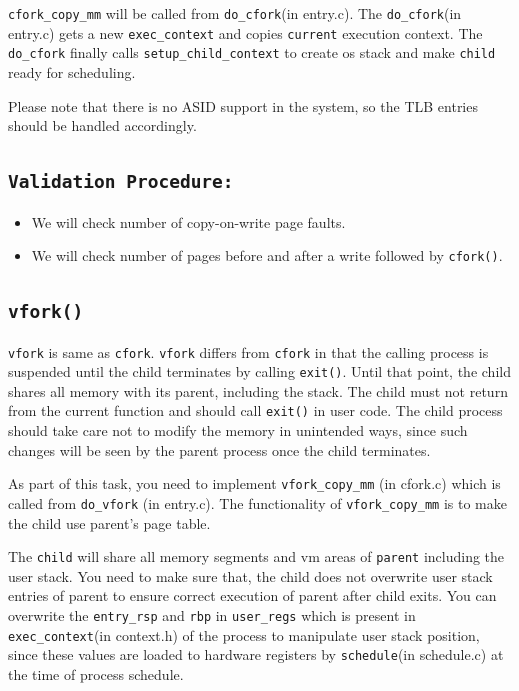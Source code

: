 \documentclass[12pt]{article}
\begin{document}
{\tt cfork\_copy\_mm} will be called from {\tt do\_cfork}(in entry.c). The {\tt do\_cfork}(in entry.c) gets a new {\tt exec\_context}
and copies {\tt current} execution context. The {\tt do\_cfork} finally calls {\tt setup\_child\_context} to create os stack and make {\tt child} ready for scheduling.

Please note that there is no ASID support in the system, so the TLB entries should be handled accordingly.

\subsection*{\tt Validation Procedure:}		
     \begin{itemize}		
        \item We will check number of copy-on-write page faults.		
        \item We will check number of pages before and after a write followed by {\tt cfork()}.		
        \end{itemize}

\subsection*{\tt vfork()}

{\tt vfork} is same as {\tt cfork}. {\tt vfork} differs from {\tt cfork} in that the calling process is suspended until the child terminates by calling {\tt exit()}. Until that point, the child shares all memory with its parent, including the stack. The child must not return from the current function and should call {\tt exit()} in user code. The child process should take care not to modify the memory in unintended ways, since such changes will be seen by the parent process once the child terminates.

			
As part of this task, you need to implement {\tt vfork\_copy\_mm} (in cfork.c) which is called from {\tt do\_vfork} (in entry.c). The functionality of {\tt vfork\_copy\_mm} is to make the child use parent's page table.

The {\tt child} will share all memory segments and vm areas of {\tt parent} including the user stack. You need to make sure that, the child does not overwrite user stack entries of parent to ensure correct execution of parent after child exits. You can overwrite the {\tt entry\_rsp} and {\tt rbp} in {\tt user\_regs} which is present in {\tt exec\_context}(in context.h) of the process to manipulate user stack position, since these values are loaded to hardware registers by {\tt schedule}(in schedule.c) at the time of process schedule.
\end{document}
